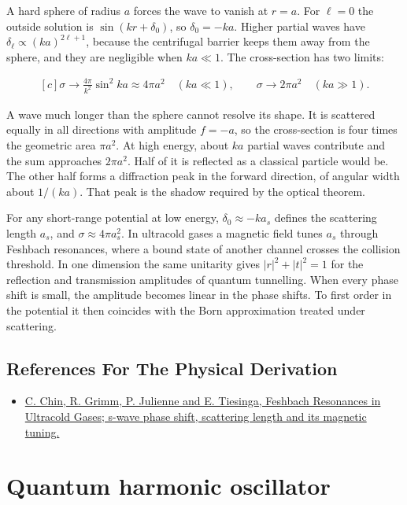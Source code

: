 \documentclass[11pt,oneside]{book}
\newenvironment{centeredalign}{\[\begin{gathered}[c]}{\end{gathered}\]}
\begin{document}
A hard sphere of radius \(a\) forces the wave to vanish at \(r=a\). For \(\ell=0\) the outside solution is \(\sin(kr+\delta_0)\), so \(\delta_0=-ka\). Higher partial waves have \(\delta_\ell\propto(ka)^{2\ell+1}\), because the centrifugal barrier keeps them away from the sphere, and they are negligible when \(ka\ll1\). The cross-section has two limits:

\begin{centeredalign}
\sigma\to\frac{4\pi}{k^2}\sin^2ka\approx4\pi a^2\quad(ka\ll1),\qquad
\sigma\to2\pi a^2\quad(ka\gg1).
\end{centeredalign}

A wave much longer than the sphere cannot resolve its shape. It is scattered equally in all directions with amplitude \(f=-a\), so the cross-section is four times the geometric area \(\pi a^2\). At high energy, about \(ka\) partial waves contribute and the sum approaches \(2\pi a^2\). Half of it is reflected as a classical particle would be. The other half forms a diffraction peak in the forward direction, of angular width about \(1/(ka)\). That peak is the shadow required by the optical theorem.

For any short-range potential at low energy, \(\delta_0\approx-ka_s\) defines the scattering length \(a_s\), and \(\sigma\approx4\pi a_s^2\). In ultracold gases a magnetic field tunes \(a_s\) through Feshbach resonances, where a bound state of another channel crosses the collision threshold. In one dimension the same unitarity gives \(|r|^2+|t|^2=1\) for the reflection and transmission amplitudes of quantum tunnelling. When every phase shift is small, the amplitude becomes linear in the phase shifts. To first order in the potential it then coincides with the Born approximation treated under scattering.

\subsection*{References For The Physical Derivation}
\begin{itemize}
\item \href{https://arxiv.org/abs/0812.1496}{C. Chin, R. Grimm, P. Julienne and E. Tiesinga, Feshbach Resonances in Ultracold Gases; s-wave phase shift, scattering length and its magnetic tuning.}
\end{itemize}





\clearpage

\section{Quantum harmonic oscillator}
\end{document}
